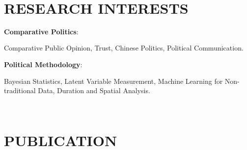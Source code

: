 \documentclass[10.5pt,]{article}
\providecommand{\tightlist}{%
	\setlength{\itemsep}{0pt}\setlength{\parskip}{0pt}}
\renewenvironment{itemize}{
	\begin{list}{}{
			\setlength{\leftmargin}{1.5em}
		}
	}{
	\end{list}
}
\begin{document}
 ~

 \hypertarget{research-interests}{%
 \section{RESEARCH INTERESTS}\label{research-interests}}

 \begin{itemize}
 \tightlist
 \item
   \textbf{Comparative Politics}:

   \begin{itemize}
   \tightlist
   \item
     Comparative Public Opinion, Trust, Chinese Politics, Political
     Communication.
   \end{itemize}
 \item
   \textbf{Political Methodology}:

   \begin{itemize}
   \tightlist
   \item
     Bayesian Statistics, Latent Variable Measurement, Machine Learning
     for Non-traditional Data, Duration and Spatial Analysis.
   \end{itemize}
 \end{itemize}

 ~

 \hypertarget{publication}{%
 \section{PUBLICATION}\label{publication}}
\end{document}
